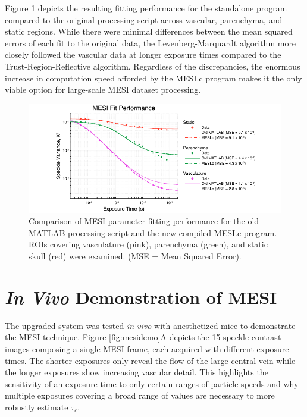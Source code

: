 Figure \ref{fig:mesifit} depicts the resulting fitting performance for the standalone program compared to the original processing script across vascular, parenchyma, and static regions. While there were minimal differences between the mean squared errors of each fit to the original data, the Levenberg-Marquardt algorithm more closely followed the vascular data at longer exposure times compared to the Trust-Region-Reflective algorithm. Regardless of the discrepancies, the enormous increase in computation speed afforded by the MESI.c program makes it the only viable option for large-scale MESI dataset processing.

\begin{figure}
    \includegraphics{figures/chapter_4/mesifit.pdf}
    \caption[Comparison of MESI parameter fitting performance for the old MATLAB processing script and the new compiled MESI.c program.]{
        \label{fig:mesifit}
        Comparison of MESI parameter fitting performance for the old MATLAB processing script and the new compiled MESI.c program. ROIs covering vasculature (pink), parenchyma (green), and static skull (red) were examined. (MSE = Mean Squared Error).
    }
\end{figure}



\section{\textit{In Vivo} Demonstration of MESI}

The upgraded system was tested \textit{in vivo} with anesthetized mice to demonstrate the MESI technique. Figure \ref{fig:mesidemo}A depicts the 15 speckle contrast images composing a single MESI frame, each acquired with different exposure times. The shorter exposures only reveal the flow of the large central vein while the longer exposures show increasing vascular detail. This highlights the sensitivity of an exposure time to only certain ranges of particle speeds and why multiple exposures covering a broad range of values are necessary to more robustly estimate $\tau_c$.

